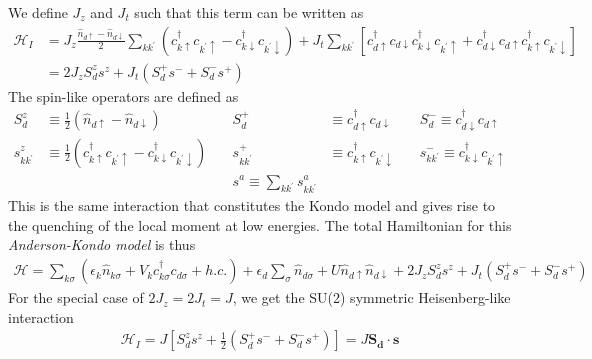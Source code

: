 \documentclass[twoside,11pt]{report}
\numberwithin{equation}{section}
\begin{document}
We define \(J_z\) and \(J_t\) such that this term can be written as
\begin{equation}\begin{aligned}
	\mathcal{H}_{I} &= J_z \frac{\hat n_{d\uparrow} - \hat n_{d\downarrow}}{2}\sum_{kk^\prime}\left(c^\dagger_{k\uparrow}c_{k^\prime\uparrow} - c^\dagger_{k\downarrow}c_{k^\prime\downarrow}\right) + J_t \sum_{kk^\prime}\left[ c^\dagger_{d\uparrow}c_{d\downarrow}c^\dagger_{k\downarrow}c_{k^\prime\uparrow} + c^\dagger_{d\downarrow}c_{d\uparrow}c^\dagger_{k\uparrow}c_{k^\prime\downarrow}\right]\\
			&= 2J_z S_d^z s^z + J_t \left(S_d^+ s^- + S_d^- s^+\right)
\end{aligned}\end{equation}
The spin-like operators are defined as
\begin{equation}\begin{aligned}
	S^z_d &\equiv \frac{1}{2}\left(\hat n_{d\uparrow} - \hat n_{d\downarrow}\right) \quad&S^+_d &\equiv c^\dagger_{d\uparrow}c_{d\downarrow}\quad &S^-_d \equiv c^\dagger_{d\downarrow}c_{d\uparrow}\\
	s^z_{kk^\prime} &\equiv \frac{1}{2}\left(c^\dagger_{k\uparrow}c_{k^\prime\uparrow} - c^\dagger_{k\downarrow}c_{k^\prime\downarrow}\right) \quad &s^+_{kk^\prime} &\equiv c^\dagger_{k\uparrow}c_{k^\prime\downarrow}\quad &s^-_{kk^\prime} \equiv c^\dagger_{k\downarrow}c_{k^\prime\uparrow}\\
        &&s^a \equiv \sum_{kk^\prime}s^a_{kk^\prime}
\end{aligned}\end{equation}
This is the same interaction that constitutes the Kondo model and gives rise to the quenching of the local moment at low energies. The total Hamiltonian for this \textit{Anderson-Kondo model} is thus
\begin{equation}\begin{aligned}
	\label{andham}
	\mathcal{H} = \sum_{k\sigma}\left(\epsilon_k \hat n_{k\sigma} + V_{k} c^\dagger_{k\sigma} c_{d\sigma} + h.c.\right) + \epsilon_{d}\sum_\sigma  \hat n_{d\sigma} +  U \hat n_{d\uparrow} \hat n_{d\downarrow} + 2J_z S_d^z s^z + J_t \left(S_d^+ s^- + S_d^- s^+\right)
\end{aligned}\end{equation}
For the special case of \(2J_z = 2J_t = J\), we get the SU(2) symmetric Heisenberg-like interaction
\begin{equation}\begin{aligned}
	\mathcal{H}_{I} = J \left[S^z_d s^z + \frac{1}{2}\left(S^+_d s^- + S^-_d s^+\right)\right] = J \mathbf{S_d} \cdot \mathbf{s}
\end{aligned}\end{equation}
\end{document}
